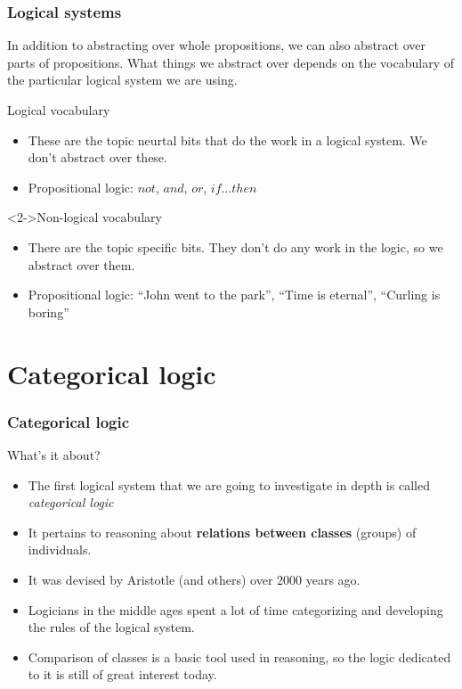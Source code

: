 \documentclass[10pt,letterpaper,xcolor=dvipsnames]{beamer}
\begin{document}
\begin{frame}
  \frametitle{Logical systems}
  
  In addition to abstracting over whole propositions, we can also abstract over parts of propositions. What things we abstract over depends on the vocabulary of the particular logical system we are using.
  
  \begin{block}{Logical vocabulary}
    \begin{itemize}
      \item These are the topic neurtal bits that do the work in a logical system.  We don't abstract over these.
      \item Propositional logic: $not$, $and$, $or$, $if\ldots then$
    \end{itemize}
  \end{block}
  
  \begin{block}<2->{Non-logical vocabulary}
    \begin{itemize}
      \item There are the topic specific bits.  They don't do any work in the logic, so we abstract over them.
      \item Propositional logic: ``John went to the park'', ``Time is eternal'', ``Curling is boring''
    \end{itemize}
  \end{block}
\end{frame}

\section{Categorical logic}

\begin{frame}
  \frametitle{Categorical logic}
  
  \begin{block}{What's it about?}
  \begin{itemize}
    \item The first logical system that we are going to investigate in depth is called \textit{categorical logic}
    \item It pertains to reasoning about \textbf{relations between classes} (groups) of individuals.
    \item It was devised by Aristotle (and others) over 2000 years ago.
    \item Logicians in the middle ages spent a lot of time categorizing and developing the rules of the logical system.
    \item Comparison of classes is a basic tool used in reasoning, so the logic dedicated to it is still of great interest today.
  \end{itemize}
  \end{block}
\end{frame}
\end{document}
